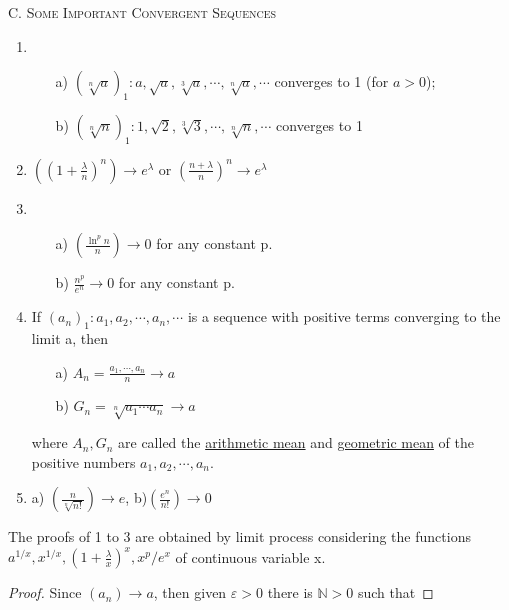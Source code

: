 \documentclass[12pt]{article}
\begin{document}
    \begin{large} %
        \textsc{C. Some Important Convergent Sequences}
    \end{large}
    \begin{enumerate}
        \item
        \begin{enumerate}
            \item[a)] $(\sqrt[n]{a})_1 : a, \sqrt{a}, \sqrt[3]{a}, \cdots, \sqrt[n]{a}, \cdots$ converges to 1
            (for $a>0$);
            \item[b)] $(\sqrt[n]{n})_1 : 1, \sqrt{2}, \sqrt[3]{3}, \cdots, \sqrt[n]{n},\cdots$ converges to 1
        \end{enumerate}
        \item $((1 + 
            \frac
                {\lambda}{n}
            )^n) \rightarrow e^\lambda$ or $(
            \frac
                {n+\lambda}{n}
            )^n \rightarrow e^\lambda$
        \item
        \begin{enumerate}
            \item[a)] $(
            \frac
                {\ln^p n}{n}
            ) \rightarrow 0$ for any constant p.
            \item[b)] $
                \frac{n^p}{e^n}
            \rightarrow 0$ for any constant p.
        \end{enumerate}
        \item If $(a_n)_1:a_1,a_2,\cdots,a_n,\cdots$ is a sequence with positive terms converging to the limit a, then
        \begin{enumerate}
            \item[a)] $A_n = 
            \frac
                {a_1,\cdots,a_n}{n}
            \rightarrow a$
            \item[b)] $G_n = 
                \sqrt
                    [n]{a_1 \cdots a_n}
                \rightarrow a$
        \end{enumerate}
         where $A_n, G_n$ are called the \underline{arithmetic mean} and \underline{geometric mean} of the positive numbers $a_1, a_2, \cdots , a_n$. 
        \item a) $(
            \frac
                {n}{\sqrt[n]{n!}}
            ) \rightarrow e$, \hspace{3cm} b)$(
            \frac
                {e^n}{n!}
            ) \rightarrow 0$
    \end{enumerate}
    
    The proofs of 1 to 3 are obtained by limit process considering the functions $a^{1/x}, x^{1/x}, (1+
        \frac
            {\lambda}{x}
        )^x, x^p/e^x$ of continuous variable x.
    \begin{proof} 
        Since  $(a_n) \rightarrow a$, then given $\varepsilon > 0$ there is $\mathbb{N}>0$ such that
    \end{proof}
\end{document}
